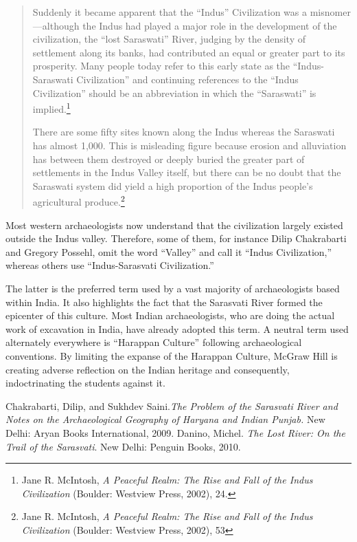 \begin{quote}
Suddenly it became apparent that the “Indus” Civilization was a misnomer—although the Indus had played a major role in the development of the civilization, the “lost Saraswati” River, judging by the density of settlement along its banks, had contributed an equal or greater part to its prosperity. Many people today refer to this early state as the “Indus-Saraswati Civilization” and continuing references to the “Indus Civilization” should be an abbreviation in which the “Saraswati” is implied.\footnote{Jane 	R. McIntosh, \textit{A Peaceful Realm: The Rise and Fall of the Indus Civilization} (Boulder: Westview Press, 2002), 24.}
\medskip

There are some fifty sites known along the Indus whereas the Saraswati has almost 1,000. This is misleading figure because erosion and alluviation has between them destroyed or deeply buried the greater part of settlements in the Indus Valley itself, but there can be no doubt that the Saraswati system did yield a high proportion of the Indus people’s agricultural produce.\footnote{Jane R. McIntosh, \textit{A Peaceful Realm: The Rise and Fall of the Indus Civilization} (Boulder: Westview Press, 2002), 53}
\end{quote}

Most western archaeologists now understand that the civilization largely existed outside the Indus valley. Therefore, some of them, for instance Dilip Chakrabarti and Gregory Possehl, omit the word “Valley” and call it “Indus Civilization,” whereas others use “Indus-Sarasvati Civilization.” 

The latter is the preferred term used by a vast majority of archaeologists based within India. It also highlights the fact that the Sarasvati River formed the epicenter of this culture. Most Indian archaeologists, who are doing the actual work of excavation in India, have already adopted this term. A neutral term used alternately everywhere is “Harappan Culture” following archaeological conventions. By limiting the expanse of the Harappan Culture, McGraw Hill is creating adverse reflection on the Indian heritage and consequently, indoctrinating the students against it. 

\begin{thebibliography}{99}
 Chakrabarti, Dilip, and Sukhdev Saini.\textit{The Problem of the Sarasvati River and Notes on the Archaeological Geography of Haryana and Indian Punjab.} New Delhi: Aryan Books International, 2009.
 Danino, Michel. \textit{The Lost River: On the Trail of the Sarasvati}. New Delhi: Penguin Books, 2010.
\end{thebibliography}

